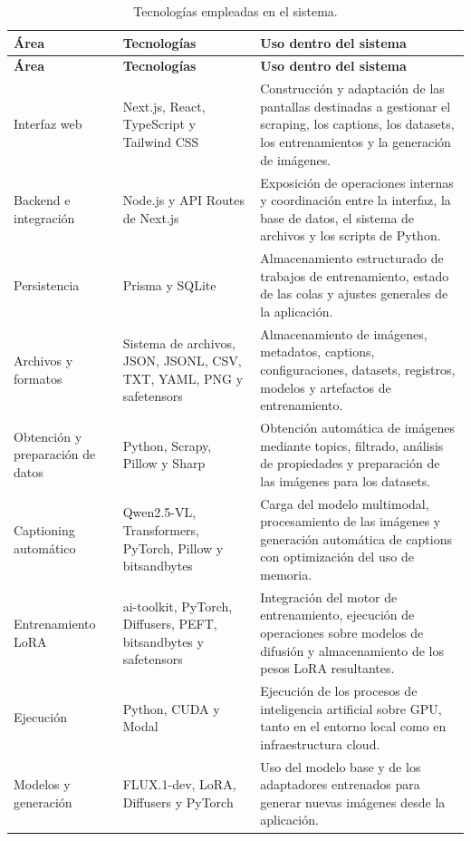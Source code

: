 \documentclass[a4paper,11pt,titlepage]{scrbook}
\begin{document}
\begin{longtable}{|L{0.18\textwidth}|L{0.27\textwidth}|L{0.43\textwidth}|}
\caption{Tecnologías empleadas en el sistema.}
\label{tab:tecnologias_diseno}\\
\hline
\textbf{Área} & \textbf{Tecnologías} & \textbf{Uso dentro del sistema} \\
\hline
\endfirsthead

\hline
\textbf{Área} & \textbf{Tecnologías} & \textbf{Uso dentro del sistema} \\
\hline
\endhead
Interfaz web &
Next.js, React, TypeScript y Tailwind CSS &
Construcción y adaptación de las pantallas destinadas a gestionar el scraping, los captions, los datasets, los entrenamientos y la generación de imágenes. \\
\hline
Backend e integración &
Node.js y API Routes de Next.js &
Exposición de operaciones internas y coordinación entre la interfaz, la base de datos, el sistema de archivos y los scripts de Python. \\
\hline
Persistencia &
Prisma y SQLite &
Almacenamiento estructurado de trabajos de entrenamiento, estado de las colas y ajustes generales de la aplicación. \\
\hline
Archivos y formatos &
Sistema de archivos, JSON, JSONL, CSV, TXT, YAML, PNG y safetensors &
Almacenamiento de imágenes, metadatos, captions, configuraciones, datasets, registros, modelos y artefactos de entrenamiento. \\
\hline
Obtención y preparación de datos &
Python, Scrapy, Pillow y Sharp &
Obtención automática de imágenes mediante topics, filtrado, análisis de propiedades y preparación de las imágenes para los datasets. \\
\hline
Captioning automático &
Qwen2.5-VL, Transformers, PyTorch, Pillow y bitsandbytes &
Carga del modelo multimodal, procesamiento de las imágenes y generación automática de captions con optimización del uso de memoria. \\
\hline
Entrenamiento LoRA &
ai-toolkit, PyTorch, Diffusers, PEFT, bitsandbytes y safetensors &
Integración del motor de entrenamiento, ejecución de operaciones sobre modelos de difusión y almacenamiento de los pesos LoRA resultantes. \\
\hline
Ejecución &
Python, CUDA y Modal &
Ejecución de los procesos de inteligencia artificial sobre GPU, tanto en el entorno local como en infraestructura cloud. \\
\hline
Modelos y generación &
FLUX.1-dev, LoRA, Diffusers y PyTorch &
Uso del modelo base y de los adaptadores entrenados para generar nuevas imágenes desde la aplicación. \\
\hline
\end{longtable}
\endgroup
\end{document}
